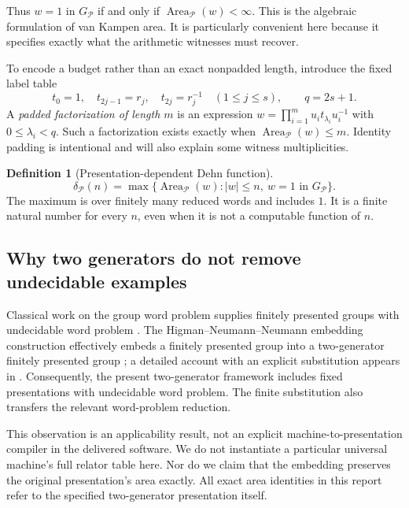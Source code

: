 \documentclass[11pt,letterpaper]{article}
\theoremstyle{definition}
\newtheorem{definition}[theorem]{Definition}
\theoremstyle{remark}
\newcommand{\Pp}{\mathcal P}
\newcommand{\Area}{\operatorname{Area}}
\begin{document}
Thus $w=1$ in $G_{\Pp}$ if and only if $\Area_{\Pp}(w)<\infty$. This is the algebraic formulation of van Kampen area. It is particularly convenient here because it specifies exactly what the arithmetic witnesses must recover.

To encode a budget rather than an exact nonpadded length, introduce the fixed label table
\begin{equation}\label{gts:vk:eq:labels}
 t_0=1,\quad t_{2j-1}=r_j,\quad t_{2j}=r_j^{-1}
 \quad(1\leq j\leq s),\qquad q=2s+1.
\end{equation}
A \emph{padded factorization of length $m$} is an expression
$w=\prod_{i=1}^{m}u_it_{\lambda_i}u_i^{-1}$ with
$0\leq\lambda_i<q$. Such a factorization exists exactly when
$\Area_{\Pp}(w)\leq m$. Identity padding is intentional and will also explain some witness multiplicities.

\begin{definition}[Presentation-dependent Dehn function]
\begin{equation}\label{gts:vk:eq:dehn}
 \delta_{\Pp}(n)=\max\{\Area_{\Pp}(w): |w|\leq n,\ w=1\text{ in }G_{\Pp}\}.
\end{equation}
The maximum is over finitely many reduced words and includes $1$. It is a finite natural number for every $n$, even when it is not a computable function of $n$.
\end{definition}

\subsection{Why two generators do not remove undecidable examples}

Classical work on the group word problem supplies finitely presented groups with undecidable word problem \cite{boone}. The Higman--Neumann--Neumann embedding construction effectively embeds a finitely presented group into a two-generator finitely presented group \cite{hnn}; a detailed account with an explicit substitution appears in \cite[Section~2.3]{bridson}. Consequently, the present two-generator framework includes fixed presentations with undecidable word problem. The finite substitution also transfers the relevant word-problem reduction.

This observation is an applicability result, not an explicit machine-to-presentation compiler in the delivered software. We do not instantiate a particular universal machine's full relator table here. Nor do we claim that the embedding preserves the original presentation's area exactly. All exact area identities in this report refer to the specified two-generator presentation itself.
\end{document}
